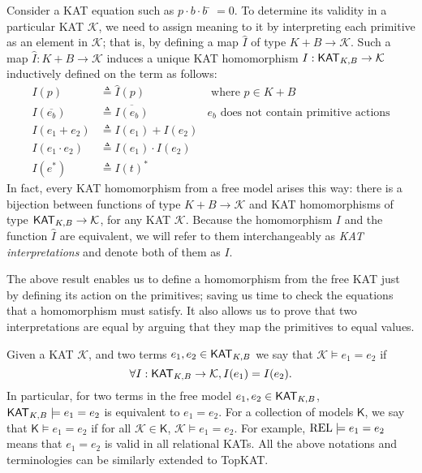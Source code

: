 Consider a KAT equation such as \(p ⋅ b ⋅ b̄ = 0\). To determine its
validity in a particular KAT \(\mathcal{K}\), we need to assign meaning to it by
interpreting each primitive as an element in \(\mathcal{K}\); that is, by defining a map
\(\hat{I}\) of type \(K + B  \to  \mathcal{K}\).  Such a map \(\hat{I}: K + B  \to  \mathcal{K}\) induces a
unique KAT homomorphism \(I : \mathsf{KAT}_{K,B}  \to  \mathcal{K}\) inductively defined on the term 
as follows:
\begin{equation}
    \begin{aligned}
        I(p)       &  \triangleq  \hat{I}(p)    & \text{ where } p  \in  K + B \\
        I(\overline{e_b}) &  \triangleq  \overline{I(e_b)} 
            & \text{\(e_b\) does not contain primitive actions} \\
        I(e_1 + e_2) &  \triangleq  I(e_1) + I(e_2)                     \\
        I(e_1  \cdot  e_2) &  \triangleq  I(e_1)  \cdot  I(e_2)                     \\
        I(e^*)     &  \triangleq  I(t)^*
    \end{aligned}
\end{equation}
In fact, every KAT homomorphism from a free model arises this way: there is a
bijection between functions of type \(K + B  \to  \mathcal{K}\) and KAT homomorphisms of type
\(\mathsf{KAT}_{K, B}  \to  \mathcal{K}\), for any KAT \(\mathcal{K}\).  
Because the homomorphism \(I\) and the function \(\hat{I}\) are equivalent, 
we will refer to them interchangeably as \emph{KAT interpretations} 
and denote both of them as \(I\).

The above result enables us to define a homomorphism from the free KAT just by
defining its action on the primitives; saving us time to check the equations
that a homomorphism must satisfy.  It also allows us to prove that two
interpretations are equal by arguing that they map the primitives to
equal values.

Given a KAT \(\mathcal{K}\), and two terms \(e_1, e_2  \in  \mathsf{KAT}_{K, B}\) we say that \(\mathcal{K}  \models  e_1 = e_2\) if
\[ \forall  I : \mathsf{KAT}_{K, B}  \to  \mathcal{K}, I(e_1) = I(e_2).\] In particular, 
for two terms in the free model \(e_1, e_2  \in  \mathsf{KAT}_{K, B}\),
\(\mathsf{KAT}_{K, B}  \models  e_1 = e_2\) is equivalent to \(e_1 = e_2\).  
For a collection of models \(\mathsf{K}\), 
we say that \(\mathsf{K}  \models  e_1 = e_2\) if for all \(\mathcal{K}  \in  \mathsf{K}\),
\(\mathcal{K}  \models  e_1 = e_2\).  For example, \(\mathbf{\mathrm{REL}}  \models  e_1 = e_2\) means that \(e_1 = e_2\) is
valid in all relational KATs.  All the above notations and terminologies can be
similarly extended to TopKAT.

